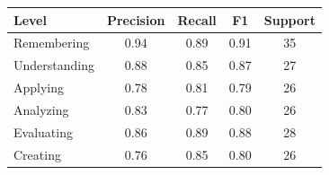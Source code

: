 \begin{tabular}{lcccc}
\hline
Level & Precision & Recall & F1 & Support \\
\hline
Remembering & 0.94 & 0.89 & 0.91 & 35 \\
Understanding & 0.88 & 0.85 & 0.87 & 27 \\
Applying & 0.78 & 0.81 & 0.79 & 26 \\
Analyzing & 0.83 & 0.77 & 0.80 & 26 \\
Evaluating & 0.86 & 0.89 & 0.88 & 28 \\
Creating & 0.76 & 0.85 & 0.80 & 26 \\
\hline
\end{tabular}